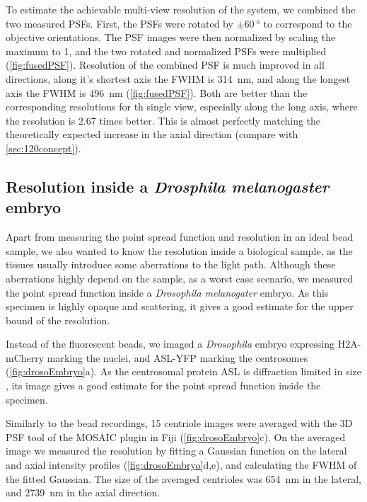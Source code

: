    To estimate the achievable multi-view resolution of the system, we combined the two measured PSFs. First, the PSFs were rotated by $\pm \SI{60}{\degree}$ to correspond to the objective orientations. The PSF images were then normalized by scaling the maximum to 1, and the two rotated and normalized PSFs were multiplied (\autoref{fig:fusedPSF}). Resolution of the combined PSF is much improved in all directions, along it's shortest axis the FWHM is \SI{314}{nm}, and along the longest axis the FWHM is \SI{496}{nm} (\autoref{fig:fusedPSF}). Both are better than the corresponding resolutions for th single view, especially along the long axis, where the resolution is 2.67 times better. This is almost perfectly matching the theoretically expected increase in the axial direction (compare with \autoref{sec:120concept}).


  \subsection{Resolution inside a \textit{Drosphila melanogaster} embryo}

    Apart from measuring the point spread function and resolution in an ideal bead sample, we also wanted to know the resolution inside a biological sample, as the tissues usually introduce some aberrations to the light path. Although these aberrations highly depend on the sample, as a worst case scenario, we measured the point spread function inside a \textit{Drosophila melanogater} embryo. As this specimen is highly opaque and scattering, it gives a good estimate for the upper bound of the resolution.

    Instead of the fluorescent beads, we imaged a \textit{Drosophila} embryo expressing H2A-mCherry marking the nuclei, and ASL-YFP marking the centrosomes (\autoref{fig:drosoEmbryo}a). As the centrosomal protein ASL is diffraction limited in size \cite{gonczy_towards_2012}, its image gives a good estimate for the point spread function inside the specimen.

    Similarly to the bead recordings, 15 centriole images were averaged with the 3D PSF tool of the MOSAIC plugin in Fiji (\autoref{fig:drosoEmbryo}c). On the averaged image we measured the resolution by fitting a Gaussian function on the lateral and axial intensity profiles (\autoref{fig:drosoEmbryo}d,e), and calculating the FWHM of the fitted Gaussian. The size of the averaged centrioles was \SI{654}{nm} in the lateral, and \SI{2739}{nm} in the axial direction.

